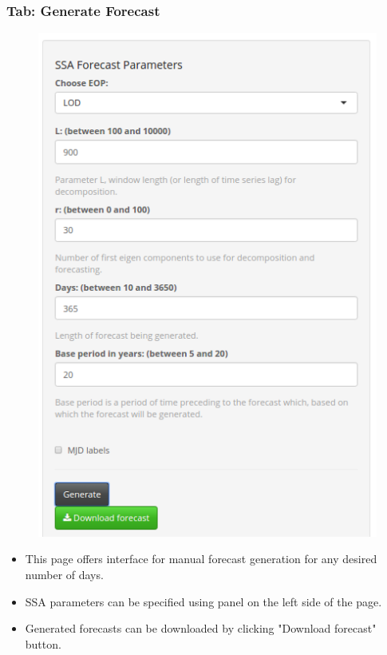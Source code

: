 \documentclass[pdf, unicode, notheorems, xcolor={table}]{beamer}
\begin{document}
\begin{frame}\frametitle{Tab: Generate Forecast}
	\begin{minipage}[t]{0.48\linewidth}
		\begin{figure}
			\includegraphics[width=\linewidth]{generate_params}
		\end{figure}
	\end{minipage}%
	\hfill%
	\begin{minipage}[t]{0.48\linewidth}
		\begin{itemize}
		\item This page offers interface for manual forecast generation for any desired number of days.

		\item SSA parameters can be specified using panel on the left side of the page.
		
		\item Generated forecasts can be downloaded by clicking "Download forecast" button.
		\end{itemize}
	\end{minipage}
\end{frame}
\end{document}
